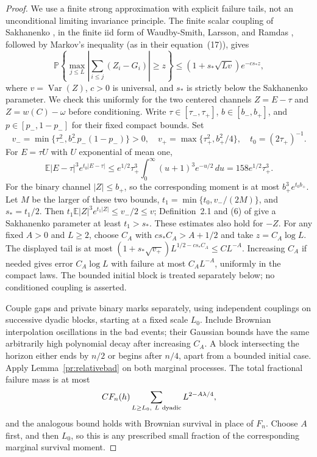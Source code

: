 \begin{proof}
We use a finite strong approximation with explicit failure tails, not an
unconditional limiting invariance principle. The finite scalar coupling of
Sakhanenko \cite[Theorem~1, p.~5]{Sakhanenko1984}, in the finite iid form of
Waudby-Smith, Larsson, and Ramdas \cite[Lemma~4.2, p.~12]{WLR}, followed
by Markov's inequality (as in their equation~(17)), gives
\[
 \mathbb P\!\left\{\max_{j\le L}
       \left|\sum_{i\le j}(Z_i-G_i)\right|\ge z\right\}
 \le (1+s_*\sqrt{Lv})e^{-cs_*z},
\]
where $v=\operatorname{Var}(Z)$, $c>0$ is universal, and $s_*$ is strictly
below the Sakhanenko parameter. We check this uniformly for the two
centered channels $Z=E-\tau$ and $Z=w(C)-\omega$ before conditioning.
Write $\tau\in[\tau_-,\tau_+]$, $b\in[b_-,b_+]$, and
$p\in[p_-,1-p_-]$ for their fixed compact bounds. Set
\[
 v_- =\min\{\tau_-^2,b_-^2p_-(1-p_-)\}>0,\quad
 v_+ =\max\{\tau_+^2,b_+^2/4\},\quad t_0=(2\tau_+)^{-1}.
\]
For $E=\tau U$ with $U$ exponential of mean one,
\[
 \mathbb E|E-\tau|^3e^{t_0|E-\tau|}
 \le e^{1/2}\tau_+^3\int_0^\infty(u+1)^3e^{-u/2}\,du
 =158e^{1/2}\tau_+^3.
\]
For the binary channel $|Z|\le b_+$, so the corresponding moment is at
most $b_+^3e^{t_0b_+}$. Let $M$ be the larger of these two bounds,
$t_1=\min\{t_0,v_-/(2M)\}$, and $s_*=t_1/2$. Then
$t_1\mathbb E|Z|^3e^{t_1|Z|}\le v_-/2\le v$; Definition~2.1 and
(6) of \cite{WLR} give a Sakhanenko parameter at least $t_1>s_*$.
These estimates also hold for $-Z$. For any fixed $A>0$ and $L\ge2$,
choose $C_A$ with $cs_*C_A>A+1/2$ and take $z=C_A\log L$. The displayed
tail is at most $(1+s_*\sqrt{v_+})L^{1/2-cs_*C_A}\le C L^{-A}$.
Increasing $C_A$ if needed gives error $C_A\log L$ with failure at most
$C_A L^{-A}$, uniformly in the compact laws. The bounded initial block
is treated separately below; no conditioned coupling is asserted.

Couple gaps and private binary marks separately, using independent
couplings on successive dyadic blocks, starting at a fixed scale $L_0$.
Include Brownian interpolation oscillations in the bad events; their
Gaussian bounds have the same arbitrarily high polynomial decay after
increasing $C_A$. A block intersecting the horizon either ends by $n/2$
or begins after $n/4$, apart from a bounded initial case. Apply
Lemma~\ref{pr:relativebad} on both marginal processes. The total
fractional failure mass is at most
\begin{equation}
 C F_n(h)\sum_{L\ge L_0,\ L\ {\rm dyadic}}L^{2-A\lambda/4},
 \label{pr:KMTrelative}
\end{equation}
and the analogous bound holds with Brownian survival in place of $F_n$.
Choose $A$ first, and then $L_0$, so this is any prescribed small
fraction of the corresponding marginal survival moment.


\end{proof}
